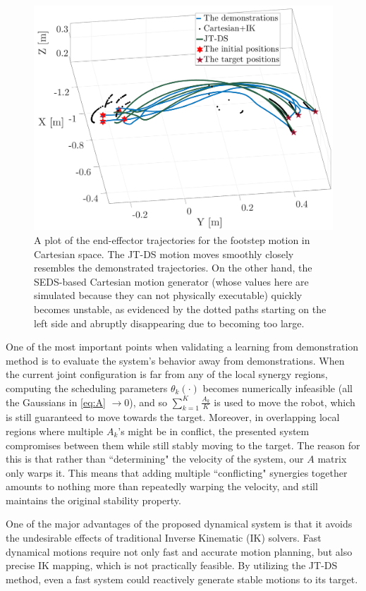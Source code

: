 \documentclass[letterpaper, 10 pt, conference,fleqn]{ieeeconf}
\begin{document}
\begin{figure}
\vspace{-10pt}
	\centering
	\includegraphics[width=0.8\linewidth]{Pic/Foot.pdf}
	\caption{A plot of the end-effector trajectories for the footstep motion in Cartesian space. The JT-DS motion moves smoothly closely resembles the demonstrated trajectories. On the other hand, the SEDS-based Cartesian motion generator (whose values here are simulated because they can not physically executable) quickly becomes unstable, as evidenced by the dotted paths starting on the left side and abruptly disappearing due to becoming too large. \label{fig:foot}}
	\vspace{-24pt}
\end{figure}

One of the most important points when validating a learning from demonstration method is to evaluate the system's behavior away from demonstrations. When the current joint configuration is far from any of the local synergy regions, computing the scheduling parameters $\theta_k(\cdot)$ becomes numerically infeasible (all the Gaussians in \eqref{eq:A} $\rightarrow 0$), and so $\sum\limits_{k=1}^{K}\frac{A_k}{K}$ is used to move the robot, which is still guaranteed to move towards the target. Moreover, in overlapping local regions where multiple $A_k$'s might be in conflict, the presented system compromises between them while still stably moving to the target. The reason for this is that rather than ``determining" the velocity of the system, our $A$ matrix only warps it. This means that adding multiple ``conflicting" synergies together amounts to nothing more than repeatedly warping the velocity, and still maintains the original stability property. 

One of the major advantages of the proposed dynamical system is that it avoids the undesirable effects of traditional Inverse Kinematic (IK) solvers. Fast dynamical motions require not only fast and accurate motion planning, but also precise IK mapping, which is not practically feasible. By utilizing the JT-DS method, even a fast system could reactively generate stable motions to its target.
\end{document}
